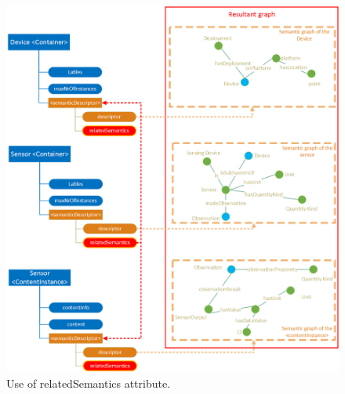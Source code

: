 \begin{figure}[htbp]
    \centering
    \includegraphics[width=1\textwidth,left]{resources/images/rs}
    \caption{Use of relatedSemantics attribute. }\label{fig:contrib2:rs}
\end{figure}


